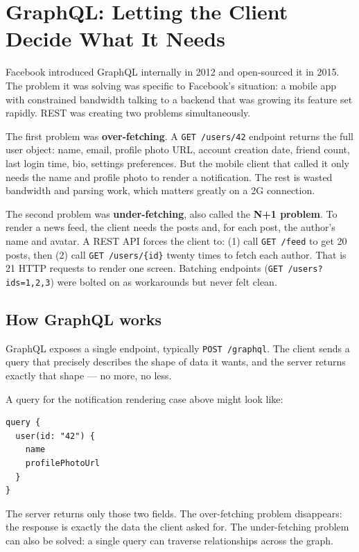 \documentclass[11pt,a4paper]{article}
\begin{document}
\section{GraphQL: Letting the Client Decide What It Needs}

Facebook introduced GraphQL internally in 2012 and open-sourced it in 2015. The problem it was solving was specific to Facebook's situation: a mobile app with constrained bandwidth talking to a backend that was growing its feature set rapidly. REST was creating two problems simultaneously.

The first problem was \textbf{over-fetching}. A \texttt{GET /users/42} endpoint returns the full user object: name, email, profile photo URL, account creation date, friend count, last login time, bio, settings preferences. But the mobile client that called it only needs the name and profile photo to render a notification. The rest is wasted bandwidth and parsing work, which matters greatly on a 2G connection.

The second problem was \textbf{under-fetching}, also called the \textbf{N+1 problem}. To render a news feed, the client needs the posts and, for each post, the author's name and avatar. A REST API forces the client to: (1) call \texttt{GET /feed} to get 20 posts, then (2) call \texttt{GET /users/\{id\}} twenty times to fetch each author. That is 21 HTTP requests to render one screen. Batching endpoints (\texttt{GET /users?ids=1,2,3}) were bolted on as workarounds but never felt clean.

\subsection{How GraphQL works}

GraphQL exposes a single endpoint, typically \texttt{POST /graphql}. The client sends a query that precisely describes the shape of data it wants, and the server returns exactly that shape --- no more, no less.

A query for the notification rendering case above might look like:

\begin{verbatim}
query {
  user(id: "42") {
    name
    profilePhotoUrl
  }
}
\end{verbatim}

The server returns only those two fields. The over-fetching problem disappears: the response is exactly the data the client asked for. The under-fetching problem can also be solved: a single query can traverse relationships across the graph.
\end{document}
